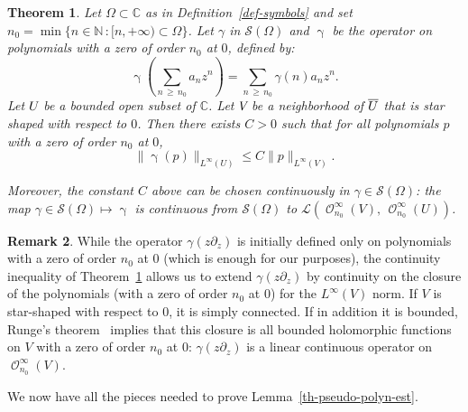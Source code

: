 \documentclass[10pt]{amsart}
\newtheorem{theo}{Theorem}[section]
\theoremstyle{definition}\newtheorem{defi}[theo]{Definition}\newtheorem{rema}[theo]{Remark}\newtheorem{exam}[theo]{Example}\newtheorem{exem}[theo]{Example}\newtheorem{nota}[theo]{Notation}
\renewcommand{\leq}{\leqslant}
\renewcommand{\geq}{\geqslant}
\newcommand{\1}{\mathds 1}
\DeclareMathOperator{\Hol}{\mathcal O}
\newcommand{\C}{\mathbb{C}}
\newcommand{\N}{\mathbb{N}}
\newcommand{\Lc}{{\mathcal L}}
\newcommand{\Sc}{{\mathcal S}}
\newcommand{\Op}[1]{\mathop{#1(z\partial_z)}}
\newcommand*{\noic}{\sb{}\kern-\scriptspace }
\begin{document}
\begin{theo}\label{th:est_default}
Let $\Omega\subset \C$ as in Definition~\ref{def-symbols} and set $n_0 = \min\{n\in\N\, : [n,+\infty) \subset \Omega\}$. Let $\gamma$ in $\Sc(\Omega)$ and $\Op{\gamma}$ be the operator on polynomials with a zero of order $n_0$ at $0$, defined by:
\[
\Op{\gamma}\left(\sum_{n\,\geq\,n_0} a_n z^n\right) = \sum_{n\,\geq\,n_0} \gamma(n) a_n z^n.
\]
Let $U\noic$ be a bounded open subset of $\C$. Let $V\noic$ be a neighborhood of $\overline U\noic$ that is star shaped with respect to $0$. Then there exists $C>0$ such that for all polynomials $p$ with a zero of order $n_0$ at $0$,
\[
\lVert\Op{\gamma}(p)\rVert_{L^\infty(U)}\leq C\|p\|_{L^\infty(V)}.
\]

Moreover, the constant $C$ above can be chosen continuously in $\gamma\in \Sc(\Omega)$: the map $\gamma\in \Sc(\Omega) \mapsto \Op{\gamma}$ is continuous from $\Sc(\Omega)$ to $\Lc(\Hol^\infty_{n_0}(V),\, \Hol^\infty_{n_0}(U))$.
\end{theo}

\begin{rema}
While the operator $\gamma(z\partial_z)$ is initially defined only on polynomials with a zero of order $n_0$ at $0$ (which is enough for our purposes), the continuity inequality of Theorem~\ref{th:est_default} allows us to extend $\gamma(z\partial_z)$ by continuity on the closure of the polynomials (with a zero of order $n_0$ at $0$) for the $L^\infty(V)$ norm. If $V$ is star-shaped with respect to $0$, it is simply connected. If in addition it is bounded, Runge's theorem~\cite[Theorem~13.9]{Rudin86} implies that this closure is all bounded holomorphic functions on $V$ with a zero of order $n_0$ at $0$: $\gamma(z\partial_z)$ is a linear continuous operator on $\Hol^\infty_{n_0}(V)$.
\end{rema}

We now have all the pieces needed to prove Lemma~\ref{th-pseudo-polyn-est}.
\end{document}
